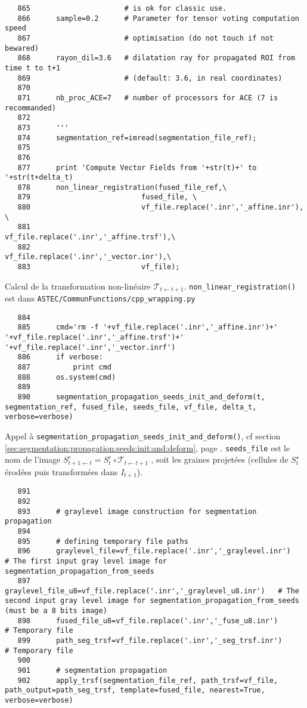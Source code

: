 \documentclass{article}
\def \mycolor {red}
\begin{document}
\begin{verbatim}
   865	                    # is ok for classic use.
   866	    sample=0.2      # Parameter for tensor voting computation speed 
   867	                    # optimisation (do not touch if not bewared)
   868	    rayon_dil=3.6   # dilatation ray for propagated ROI from time t to t+1
   869	                    # (default: 3.6, in real coordinates) 
   870	
   871	    nb_proc_ACE=7   # number of processors for ACE (7 is recommanded)
   872	
   873	    '''
   874	    segmentation_ref=imread(segmentation_file_ref);
   875	
   876	
   877	    print 'Compute Vector Fields from '+str(t)+' to '+str(t+delta_t)
   878	    non_linear_registration(fused_file_ref,\
   879	                        fused_file, \
   880	                        vf_file.replace('.inr','_affine.inr'), \
   881	                        vf_file.replace('.inr','_affine.trsf'),\
   882	                        vf_file.replace('.inr','_vector.inr'),\
   883	                        vf_file);
\end{verbatim}
\color{\mycolor}
Calcul de la transformation non-lin\'eaire $\mathcal{T}_{t \leftarrow t+1}$. \texttt{non\_linear\_registration()} est dans \texttt{ASTEC/CommunFunctions/cpp\_wrapping.py}
\color{black}
\begin{verbatim}
   884	
   885	    cmd='rm -f '+vf_file.replace('.inr','_affine.inr')+' '+vf_file.replace('.inr','_affine.trsf')+' '+vf_file.replace('.inr','_vector.inrf')
   886	    if verbose:
   887	        print cmd
   888	    os.system(cmd)
   889	
   890	    segmentation_propagation_seeds_init_and_deform(t, segmentation_ref, fused_file, seeds_file, vf_file, delta_t, verbose=verbose)
\end{verbatim} 
\color{\mycolor}
Appel \`a \texttt{segmentation\_propagation\_seeds\_init\_and\_deform()}, cf section \ref{sec:segmentation:propagation:seeds:init:and:deform}, page \pageref{sec:segmentation:propagation:seeds:init:and:deform}.
\verb|seeds_file| est le nom de l'image $S^e_{t+1 \leftarrow t} = S^e_t \circ \mathcal{T}_{t \leftarrow t+1}$ \cite[section 2.3.3.4]{guignard:tel-01278725}, soit les graines projet\'ees (cellules de $S^{\star}_t$ \'erod\'ees puis transform\'ees dans $I_{t+1}$).
\color{black}
\begin{verbatim}  
   891	
   892	
   893	    # graylevel image construction for segmentation propagation
   894	
   895	    # defining temporary file paths 
   896	    graylevel_file=vf_file.replace('.inr','_graylevel.inr')         # The first input gray level image for segmentation_propagation_from_seeds
   897	    graylevel_file_u8=vf_file.replace('.inr','_graylevel_u8.inr')   # The second input gray level image for segmentation_propagation_from_seeds (must be a 8 bits image)
   898	    fused_file_u8=vf_file.replace('.inr','_fuse_u8.inr')            # Temporary file
   899	    path_seg_trsf=vf_file.replace('.inr','_seg_trsf.inr')           # Temporary file
   900	
   901	    # segmentation propagation 
   902	    apply_trsf(segmentation_file_ref, path_trsf=vf_file, path_output=path_seg_trsf, template=fused_file, nearest=True, verbose=verbose)
\end{verbatim} 
\end{document}
